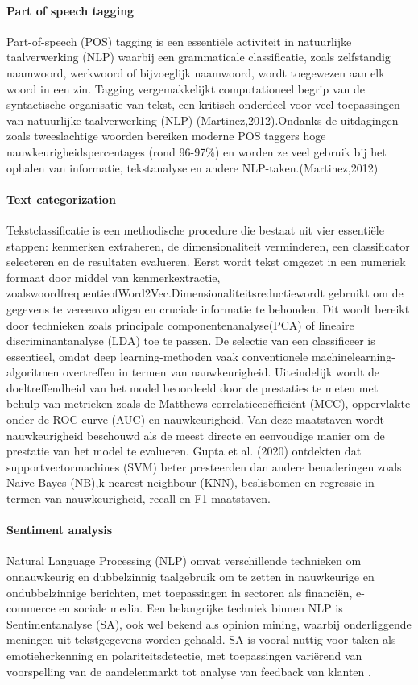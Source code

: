 \paragraph{Part of speech tagging}
Part-of-speech (POS) tagging is een essentiële activiteit in natuurlijke taalverwerking (NLP) waarbij een grammaticale classificatie, zoals zelfstandig naamwoord, werkwoord of bijvoeglijk naamwoord, wordt toegewezen aan elk woord in een zin. Tagging vergemakkelijkt computationeel begrip van de syntactische organisatie van tekst, een kritisch onderdeel voor veel toepassingen van natuurlijke taalverwerking (NLP) (Martinez,2012).Ondanks de uitdagingen zoals tweeslachtige woorden bereiken moderne POS taggers hoge nauwkeurigheidspercentages (rond 96-97\%) en worden ze veel gebruik bij het ophalen van informatie, tekstanalyse en andere NLP-taken.(Martinez,2012)
\paragraph{Text categorization}
Tekstclassificatie is een methodische procedure die bestaat uit vier essentiële stappen: kenmerken extraheren, de dimensionaliteit verminderen, een classificator selecteren en de resultaten evalueren. Eerst wordt tekst omgezet in een numeriek formaat door middel van kenmerkextractie, zoalswoordfrequentieofWord2Vec.Dimensionaliteitsreductiewordt gebruikt om de gegevens te vereenvoudigen en cruciale informatie te behouden. Dit wordt bereikt door technieken zoals principale componentenanalyse(PCA) of lineaire discriminantanalyse (LDA) toe te passen. De selectie van een classificeer is essentieel, omdat deep learning-methoden vaak conventionele machinelearning-algoritmen overtreffen in termen van nauwkeurigheid. Uiteindelijk wordt de doeltreffendheid van het model beoordeeld door de prestaties te meten met behulp van metrieken zoals de Matthews correlatiecoëfficiënt (MCC), oppervlakte onder de ROC-curve (AUC) en nauwkeurigheid. Van deze maatstaven wordt nauwkeurigheid beschouwd als de meest directe en eenvoudige manier om de prestatie van het model te evalueren. Gupta et al. (2020) ontdekten dat supportvectormachines (SVM) beter presteerden dan andere benaderingen zoals Naive Bayes (NB),k-nearest neighbour (KNN), beslisbomen en regressie in termen van nauwkeurigheid, recall en F1-maatstaven.
\paragraph{Sentiment analysis}
Natural Language Processing (NLP) omvat verschillende technieken om onnauwkeurig en dubbelzinnig taalgebruik om te zetten in nauwkeurige en ondubbelzinnige berichten, met toepassingen in sectoren als financiën, e-commerce en sociale media. Een belangrijke techniek binnen NLP is Sentimentanalyse (SA), ook wel bekend als opinion mining, waarbij onderliggende meningen uit tekstgegevens worden gehaald. SA is vooral nuttig voor taken als emotieherkenning en polariteitsdetectie, met toepassingen variërend van voorspelling van de aandelenmarkt tot analyse van feedback van klanten \autocite{Gupta2020}.

